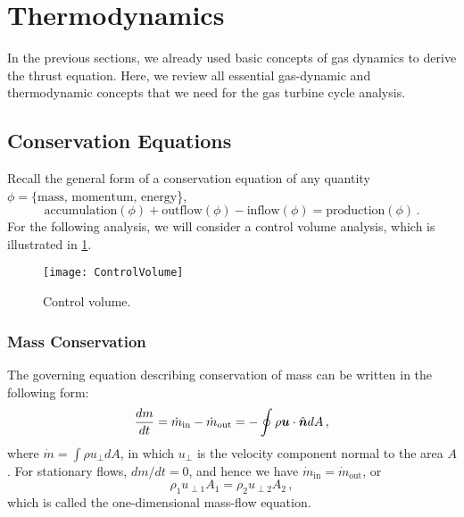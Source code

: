 \section{Thermodynamics}
In the previous sections, we already used basic concepts of gas dynamics to derive the thrust equation. Here, we review all essential gas-dynamic and thermodynamic concepts that we need for the gas turbine cycle analysis.
\subsection{Conservation Equations}
Recall the general form of a conservation equation of any quantity $\phi = \{{\text{mass},\, \text{momentum},\, \text{energy}}$\},
\begin{equation}
\text{accumulation}(\phi) + \text{outflow}(\phi) - \text{inflow}(\phi) = \text{production}(\phi)\,.
\end{equation}
For the following analysis, we will consider a control volume analysis, which is illustrated in \cref{FIG_CONTROL_VOLUME}.

\begin{figure}[!hbt!]
  \begin{center}
    \texttt{[image: ControlVolume]}
    \caption{\label{FIG_CONTROL_VOLUME}Control volume.}
  \end{center}
\end{figure}

\subsubsection{Mass Conservation}
The governing equation describing conservation of mass can be written in the following form:
\begin{equation}
  {\frac{dm}{dt}} = \dot{m}_\text{in} - \dot{m}_\text{out} = - \oint \rho {\mbox{\boldmath$u$}} \cdot \hat{{\mbox{\boldmath$n$}}} dA\,,
\end{equation}
where $\dot{m} = \int \rho u_\perp dA$, in which $u_\perp$ is the velocity component normal to the area $A$. For stationary flows, $dm/dt = 0$, and hence we have $\dot{m}_\text{in} = \dot{m}_\text{out}$, or
\begin{equation}
  \rho_1 u_{\perp1} A_1 = \rho_2 u_{\perp2} A_2\,,
\end{equation}
which is called the one-dimensional mass-flow equation.

